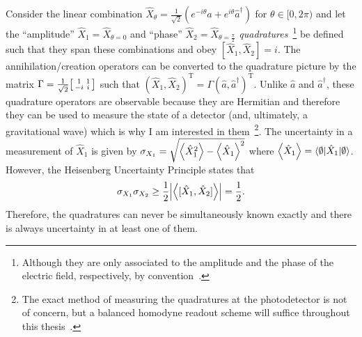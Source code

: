 Consider the linear combination $\hat{X}_\theta=\frac{1}{\sqrt 2}(e^{-i \theta}\hat{a}+e^{i \theta}\hat{a}^\dag)$ for $\theta\in[0,2\pi)$ and let the ``amplitude'' $\hat{X}_1=\hat{X}_{\theta=0}$ and ``phase'' $\hat{X}_2=\hat{X}_{\theta=\frac{\pi}{2}}$ \emph{quadratures}~\footnote{Although they are only associated to the amplitude and the phase of the electric field, respectively, by convention~\cite{danilishinQuantumMeasurementTheory2012}.} be defined such that they span these combinations and obey $[\hat{X}_1,\hat{X}_2]=i$. The annihilation/creation operators can be converted to the quadrature picture by the matrix $\Gamma = \frac{1}{\sqrt2} \begin{bsmallmatrix}1 & 1 \\-i & i\end{bsmallmatrix}$ such that $(\hat{X}_1,\hat{X}_2)^\text{T}=\Gamma(\hat{a},\hat{a}^\dag)^\text{T}$. %
Unlike $\hat a$ and $\hat a^\dag$, these quadrature operators are observable because they are Hermitian and therefore they can be used to measure the state of a detector (and, ultimately, a gravitational wave) which is why I am interested in them~\footnote{The exact method of measuring the quadratures at the photodetector is not of concern, but a balanced homodyne readout scheme will suffice throughout this thesis~\cite{danilishinQuantumMeasurementTheory2012}.}. The uncertainty in a measurement of $\hat{X}_1$ is given by $\sigma_{X_1}=\sqrt{\ev{\hat{X}_1^2}-\ev{\hat{X}_1}^2}$ where $\ev{\hat{X}_1}=\langle\emptyset\lvert\hat{X}_1\rvert\emptyset\rangle$. However, the Heisenberg Uncertainty Principle states that
\begin{equation}\label{eq:HUP_time_domain}
\sigma_{X_1}\sigma_{X_2}\geq\frac{1}{2}\abs{\ev{[\hat{X}_1,\hat{X}_2]}}=\frac{1}{2}.
\end{equation}
Therefore, the quadratures can never be simultaneously known exactly and there is always uncertainty in at least one of them. %
